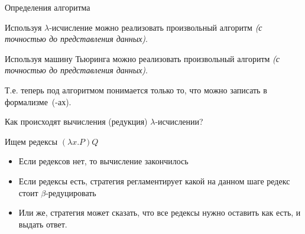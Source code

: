 \begin{frame}{Определения алгоритма}
 \begin{theorem}
  Используя $\lambda$-исчисление можно реализовать произвольный алгоритм
  \emph{(с точностью до представления данных)}.
\end{theorem}
\begin{theorem}
Используя машину Тьюринга можно реализовать произвольный алгоритм
\emph{(с точностью до представления данных)}.
\end{theorem}
\vspace{1em}
Т.е. теперь под алгоритмом понимается только то, что можно записать в формализ\-ме~(-ах).
\end{frame}

\begin{frame}{Как происходят вычисления (редукция) $\lambda$-исчислении?}
  \begin{definition}
    Ищем редексы $(\lambda x. P)Q$
    \begin{itemize}
      \item Если редексов нет, то вычисление закончилось
      \item Если редексы есть, стратегия регламентирует какой на данном шаге редекс стоит $\beta$-редуцировать
      \item Или же, стратегия может сказать, что все редексы нужно оставить как есть, и выдать ответ.
    \end{itemize}
  \end{definition}
\end{frame}


